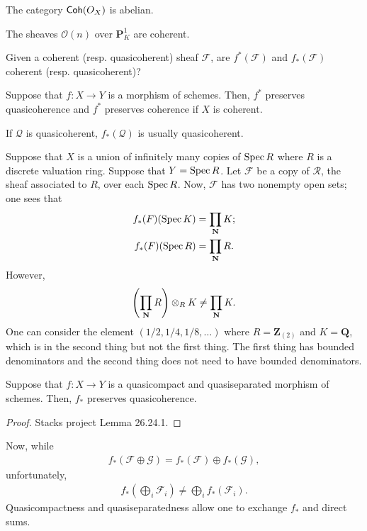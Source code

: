 \documentclass [11 pt, oneside] {article}
\begin{document}
The category $\textsf{Coh}(\relax{O}_X)$ is abelian.

\begin{example}[ ]\label{}\text{}
The sheaves $\mathscr{O}(n)$ over $\mathbf{P}^1_K$ are coherent.
\end{example}

\begin{problem}
	Given a coherent (resp. quasicoherent) sheaf $\mathscr{F}$, are $f^*(\mathscr{F})$ and $f_*(\mathscr{F})$ coherent (resp. quasicoherent)?
\end{problem}

Suppose that $f:X\longrightarrow Y$ is a morphism of schemes. Then, $f^*$ preserves quasicoherence and $f^*$ preserves coherence if $X$ is coherent.

If $\mathscr{Q}$ is quasicoherent, $f_*(\mathscr{Q})$ is usually quasicoherent.
\begin{example}\label{}\text{}
Suppose that $X$ is a union of infinitely many copies of $\operatorname{Spec} R$ where $R$ is a discrete valuation ring. Suppose that $Y=\operatorname{Spec} R$. Let $\mathscr{F}$ be a copy of $\mathscr{R}$, the sheaf associated to $R$, over each $\operatorname{Spec} R$. Now, $\mathscr{F}$ has two nonempty open sets; one sees that
\begin{align*}
	f_*(\relax{F})(\operatorname{Spec} K) &= \prod_{ \mathbf{N}} K;\\
	f_*(\relax{F}) (\operatorname{Spec} R) &= \prod_{ \mathbf{N}} R.
\end{align*}
However,
\begin{align*}
	\left( \prod_{\mathbf{N}} R \right) \otimes_R K \ne \prod_{\mathbf{N}}K.
\end{align*}
One can consider the element $(1/2,1/4,1/8,\hdots)$ where $R=\mathbf{Z}_{(2)}$ and $K=\mathbf{Q}$, which is in the second thing but not the first thing. The first thing has bounded denominators and the second thing does not need to have bounded denominators.
\end{example}

\begin{theorem}[ ]\label{}\index{}\text{}
Suppose that $f:X\longrightarrow Y$ is a quasicompact and quasiseparated morphism of schemes. Then, $f_*$ preserves quasicoherence.
\end{theorem}

\begin{proof}
Stacks project Lemma 26.24.1.
\end{proof}

Now, while
\begin{align*}
	f_*(\mathscr{F}\oplus \mathscr{G}) = f_*(\mathscr{F}) \oplus  f_*(\mathscr{G}),
\end{align*}
unfortunately,
\begin{align*}
	f_* \left( \bigoplus_{i}\mathscr{F}_i \right)\ne \bigoplus_{i}f_*(\mathscr{F}_i). 
\end{align*}
Quasicompactness and quasiseparatedness allow one to exchange $f_*$ and direct sums.
\end{document}
